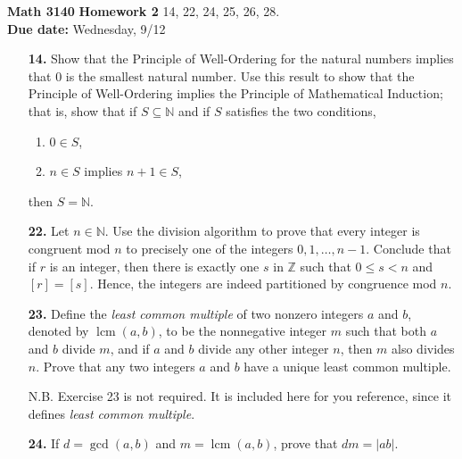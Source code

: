 \documentclass[12pt,reqno]{amsart}
\newcommand{\boldemph}{\emph}
\newcommand{\lcm}{\operatorname{lcm}}
\begin{document}
\thispagestyle{empty}

\noindent \textbf{Math 3140}  \hfill {\bf Homework 2}
\vskip1cm
  14, 22, 24, 25, 26, 28.  \\
{\bf Due date:} Wednesday, 9/12

\medskip

\begin{enumerate}

\item[{\bf 14.}]
Show that the Principle of Well-Ordering for the natural numbers implies that 0 is 
the smallest natural number.  Use this result to show that the Principle of 
Well-Ordering implies the Principle of Mathematical Induction; that is, show 
that if $S \subseteq {\mathbb N}$ and if $S$ satisfies the two conditions,
\begin{enumerate}
  \item $0 \in S$,
  \item $n \in S$ implies $n + 1 \in S$,
\end{enumerate}
then $S = \mathbb N$.  

\bigskip

\item[{\bf 22.}]
Let $n \in {\mathbb N}$.  Use the division algorithm to prove that every integer is congruent mod $n$ to precisely one of the integers $0, 1, \ldots, n-1$.  Conclude that if $r$ is an integer, then there is exactly one $s$ in ${\mathbb Z}$ such that $0 \leq s < n$ and $[r] = [s]$.   Hence, the integers are indeed partitioned by congruence mod $n$. 

\bigskip

\item[{\bf 23.}]
Define the \boldemph{least common multiple} of two nonzero integers $a$ and $b$, denoted by $\lcm(a,b)$\label{leastcm}, to be the nonnegative integer $m$ such that both $a$ and $b$ divide $m$, and if $a$ and $b$  divide any other integer $n$, then $m$ also divides $n$.  Prove that any two integers $a$ and $b$ have a unique least common multiple. 

N.B. Exercise 23 is not required. It is included here for you reference, since it defines \emph{least common multiple}.


\bigskip

\item[{\bf 24.}]
If $d= \gcd(a, b)$ and $m = \lcm(a, b)$, prove that $dm = |ab|$.



\end{enumerate}
\end{document}
